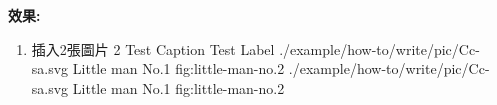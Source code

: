   \newpage

  {\bf 效果:}
  \begin{enumerate}
    \item
    {
      插入2張圖片
      \InsertMultiImages%
      {%
        {2} %
        {Test Caption} %
        {Test Label} %
      }%
      {%
        {./example/how-to/write/pic/Cc-sa.svg} %
        {Little man No.1} %
        {fig:little-man-no.2} %
      }%
      {%
        {./example/how-to/write/pic/Cc-sa.svg} %
        {Little man No.1} %
        {fig:little-man-no.2} %
      }%
    } %
  \end{enumerate}

\EndChapter
